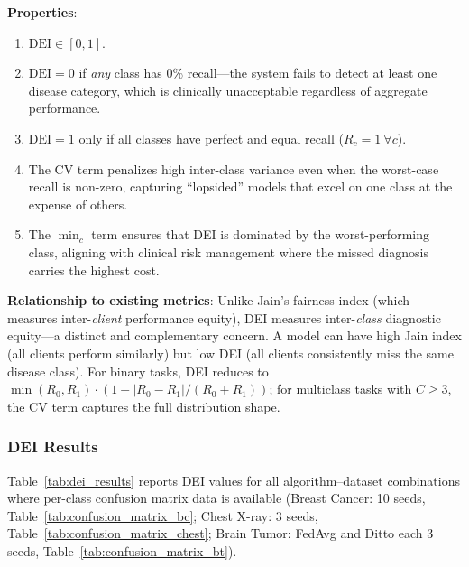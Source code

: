\documentclass[conference,a4paper]{IEEEtran}
\begin{document}
\textbf{Properties}:
\begin{enumerate}
    \item $\text{DEI} \in [0, 1]$.
    \item $\text{DEI} = 0$ if \textit{any} class has 0\% recall---the system fails to detect at least one disease category, which is clinically unacceptable regardless of aggregate performance.
    \item $\text{DEI} = 1$ only if all classes have perfect and equal recall ($R_c = 1\ \forall c$).
    \item The $\text{CV}$ term penalizes high inter-class variance even when the worst-case recall is non-zero, capturing ``lopsided'' models that excel on one class at the expense of others.
    \item The $\min_c$ term ensures that DEI is dominated by the worst-performing class, aligning with clinical risk management where the missed diagnosis carries the highest cost.
\end{enumerate}

\textbf{Relationship to existing metrics}: Unlike Jain's fairness index (which measures inter-\textit{client} performance equity), DEI measures inter-\textit{class} diagnostic equity---a distinct and complementary concern. A model can have high Jain index (all clients perform similarly) but low DEI (all clients consistently miss the same disease class). For binary tasks, DEI reduces to $\min(R_0, R_1) \cdot (1 - |R_0 - R_1|/(R_0 + R_1))$; for multiclass tasks with $C \geq 3$, the CV term captures the full distribution shape.

\subsubsection{DEI Results}

Table~\ref{tab:dei_results} reports DEI values for all algorithm--dataset combinations where per-class confusion matrix data is available (Breast Cancer: 10 seeds, Table~\ref{tab:confusion_matrix_bc}; Chest X-ray: 3 seeds, Table~\ref{tab:confusion_matrix_chest}; Brain Tumor: FedAvg and Ditto each 3 seeds, Table~\ref{tab:confusion_matrix_bt}).
\end{document}
